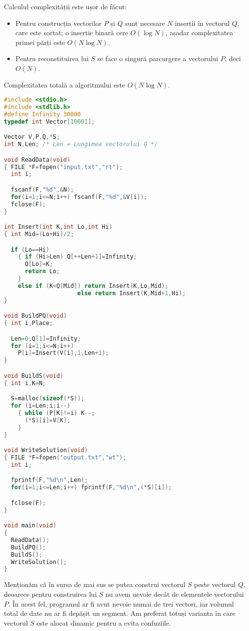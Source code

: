 Calculul complexității este ușor de făcut:

\begin{itemize}

\item Pentru construcția vectorilor $P$ și $Q$ sunt necesare $N$ inserții în
  vectorul $Q$, care este sortat; o inserție binară cere $O(\log N)$, așadar
  complexitatea primei părți este $O(N \log N)$.

\item Pentru reconstituirea lui $S$ se face o singură parcurgere a vectorului
  $P$, deci $O(N)$.

\end{itemize}

Complexitatea totală a algoritmului este $O(N \log N)$.

\begin{lstlisting}[language=C]
#include <stdio.h>
#include <stdlib.h>
#define Infinity 30000
typedef int Vector[10001];

Vector V,P,Q,*S;
int N,Len; /* Len = Lungimea vectorului Q */

void ReadData(void)
{ FILE *F=fopen("input.txt","rt");
  int i;

  fscanf(F,"%d",&N);
  for(i=1;i<=N;i++) fscanf(F,"%d",&V[i]);
  fclose(F);
}

int Insert(int K,int Lo,int Hi)
{ int Mid=(Lo+Hi)/2;

  if (Lo==Hi)
    { if (Hi>Len) Q[++Len+1]=Infinity;
      Q[Lo]=K;
      return Lo;
    }
    else if (K<Q[Mid]) return Insert(K,Lo,Mid);
                     else return Insert(K,Mid+1,Hi);
}

void BuildPQ(void)
{ int i,Place;

  Len=0;Q[1]=Infinity;
  for (i=1;i<=N;i++)
    P[i]=Insert(V[i],1,Len+1);
}

void BuildS(void)
{ int i,K=N;

  S=malloc(sizeof(*S));
  for (i=Len;i;i--)
    { while (P[K]!=i) K--;
      (*S)[i]=V[K];
    }
}

void WriteSolution(void)
{ FILE *F=fopen("output.txt","wt");
  int i;

  fprintf(F,"%d\n",Len);
  for(i=1;i<=Len;i++) fprintf(F,"%d\n",(*S)[i]);

  fclose(F);
}

void main(void)
{
  ReadData();
  BuildPQ();
  BuildS();
  WriteSolution();
}
\end{lstlisting}

Menționăm că în sursa de mai sus se putea construi vectorul $S$ peste vectorul
$Q$, deoarece pentru construirea lui $S$ nu avem nevoie decât de elementele
vectorului $P$. În acest fel, programul ar fi avut nevoie numai de trei
vectori, iar volumul total de date nu ar fi depășit un segment. Am preferat
totuși varianta în care vectorul $S$ este alocat dinamic pentru a evita
confuziile.
